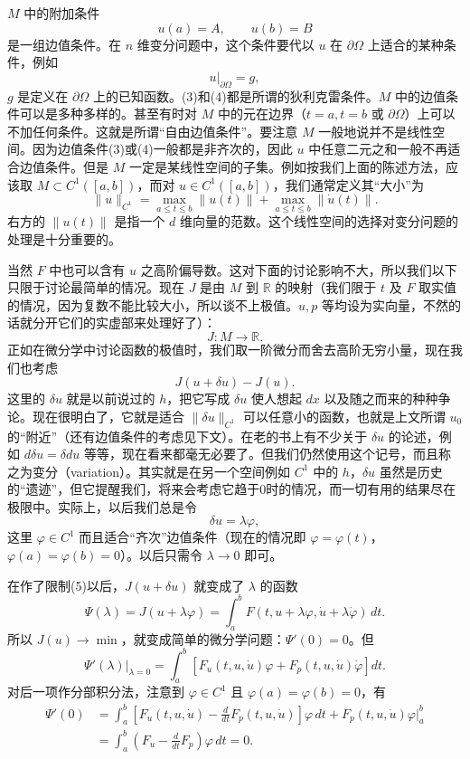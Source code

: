 $M$ 中的附加条件
\begin{equation}
 u(a)=A,\qquad u(b)=B
 \tag{3}
\end{equation}
是一组边值条件。在 $n$ 维变分问题中，这个条件要代以 $u$ 在 $\partial\Omega$ 上适合的某种条件，例如
\begin{equation}
 u|_{\partial\Omega}=g,
 \tag{4}
\end{equation}
$g$ 是定义在 $\partial\Omega$ 上的已知函数。(3)和(4)都是所谓的狄利克雷条件。$M$ 中的边值条件可以是多种多样的。甚至有时对 $M$ 中的元在边界（$t=a,t=b$ 或 $\partial\Omega$）上可以不加任何条件。这就是所谓“自由边值条件”。要注意 $M$ 一般地说并不是线性空间。因为边值条件(3)或(4)一般都是非齐次的，因此 $u$ 中任意二元之和一般不再适合边值条件。但是 $M$ 一定是某线性空间的子集。例如按我们上面的陈述方法，应该取 $M\subset C^1([a,b])$，而对 $u\in C^1([a,b])$，我们通常定义其“大小”为
\[
 \|u\|_{C^1}=\max_{a\le t\le b}\|u(t)\|+\max_{a\le t\le b}\|\dot u(t)\|.
\]
右方的 $\|u(t)\|$ 是指一个 $d$ 维向量的范数。这个线性空间的选择对变分问题的处理是十分重要的。

当然 $F$ 中也可以含有 $u$ 之高阶偏导数。这对下面的讨论影响不大，所以我们以下只限于讨论最简单的情况。现在 $J$ 是由 $M$ 到 $\mathbb R$ 的映射（我们限于 $t$ 及 $F$ 取实值的情况，因为复数不能比较大小，所以谈不上极值。$u,p$ 等均设为实向量，不然的话就分开它们的实虚部来处理好了）：
\[
 J:M\to\mathbb R.
\]
正如在微分学中讨论函数的极值时，我们取一阶微分而舍去高阶无穷小量，现在我们也考虑
\[
 J(u+\delta u)-J(u).
\]
这里的 $\delta u$ 就是以前说过的 $h$，把它写成 $\delta u$ 使人想起 $dx$ 以及随之而来的种种争论。现在很明白了，它就是适合 $\|\delta u\|_{C^1}$ 可以任意小的函数，也就是上文所谓 $u_0$ 的“附近”（还有边值条件的考虑见下文）。在老的书上有不少关于 $\delta u$ 的论述，例如 $d\delta u=\delta du$ 等等，现在看来都毫无必要了。但我们仍然使用这个记号，而且称之为变分（variation）。其实就是在另一个空间例如 $C^1$ 中的 $h$，$\delta u$ 虽然是历史的“遗迹”，但它提醒我们，将来会考虑它趋于0时的情况，而一切有用的结果尽在极限中。实际上，以后我们总是令
\begin{equation}
 \delta u=\lambda\varphi,
 \tag{5}
\end{equation}
这里 $\varphi\in C^1$ 而且适合“齐次”边值条件（现在的情况即 $\varphi=\varphi(t)$，$\varphi(a)=\varphi(b)=0$）。以后只需令 $\lambda\to0$ 即可。

在作了限制(5)以后，$J(u+\delta u)$ 就变成了 $\lambda$ 的函数
\begin{equation}
 \Psi(\lambda)=J(u+\lambda\varphi)=\int_a^b F(t,u+\lambda\varphi,\dot u+\lambda\dot\varphi)\,dt.
 \tag{6}
\end{equation}
所以 $J(u)\to\min$，就变成简单的微分学问题：$\Psi'(0)=0$。但
\[
 \left.\Psi'(\lambda)\right|_{\lambda=0}
 =\int_a^b\left[F_u(t,u,\dot u)\varphi+F_p(t,u,\dot u)\dot\varphi\right]dt.
\]
对后一项作分部积分法，注意到 $\varphi\in C^1$ 且 $\varphi(a)=\varphi(b)=0$，有
\begin{align}
 \Psi'(0)
 &=\int_a^b\left[F_u(t,u,\dot u)-\frac{d}{dt}F_p(t,u,\dot u)\right]\varphi\,dt
   +F_p(t,u,\dot u)\varphi\Big|_a^b\\
 &=\int_a^b\left(F_u-\frac{d}{dt}F_p\right)\varphi\,dt=0.
 \tag{7}
\end{align}

